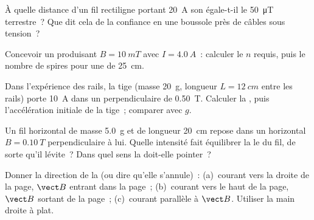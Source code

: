 \begin{exercise}[$\star\star$]\label{exo:g11:magnetic-fields:7}
À quelle distance d'un fil rectiligne portant \qty{20}{A} son
 égale-t-il le
\qty{50}{\micro T} terrestre~? Que dit cela de la confiance en une
boussole près de câbles sous tension~?
\end{exercise}

\begin{exercise}[$\star\star$]\label{exo:g11:magnetic-fields:8}
Concevoir un  produisant
$B = \qty{10}{mT}$ avec $I = \qty{4.0}{A}$~: calculer le $n$ requis,
puis le nombre de spires pour une
 de \qty{25}{cm}.
\end{exercise}

\begin{exercise}[$\star\star$]\label{exo:g11:magnetic-fields:9}
Dans l'expérience des rails, la tige (masse \qty{20}{g}, longueur
$L = \qty{12}{cm}$ entre les rails) porte \qty{10}{A} dans un
 perpendiculaire de
\qty{0.50}{T}. Calculer la
, puis l'accélération
initiale de la tige~; comparer avec $g$.
\end{exercise}

\begin{exercise}[$\star\star$]\label{exo:g11:magnetic-fields:10}
Un fil horizontal de masse \qty{5.0}{g} et de longueur \qty{20}{cm}
repose dans un 
horizontal $B = \qty{0.10}{T}$ perpendiculaire à lui. Quelle intensité
fait équilibrer la  le
 du fil, de sorte qu'il lévite~?
Dans quel sens la  doit-elle pointer~?
\end{exercise}

\begin{exercise}[$\star\star$]\label{exo:g11:magnetic-fields:11}
Donner la direction de la
 (ou dire qu'elle s'annule)~:
(a)~courant vers la droite de la page, $\vect B$ entrant dans la
page~; (b)~courant vers le haut de la page, $\vect B$ sortant de la
page~; (c)~courant parallèle à $\vect B$. Utiliser la main droite à
plat.
\end{exercise}

